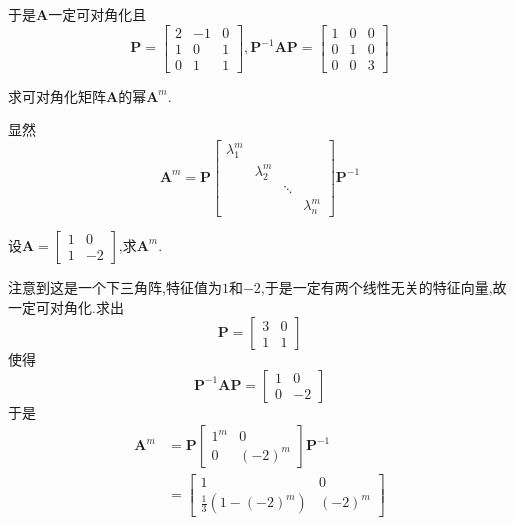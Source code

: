 \begin{brown}
\begin{Proof}
于是$\bm{A}$一定可对角化且
\[
\bm{P}=\begin{bmatrix}
    2&-1&0\\1&0&1\\0&1&1
\end{bmatrix}
,
\bm{P}^{-1}\bm{AP}=\begin{bmatrix}
    1&0&0\\0&1&0\\0&0&3
\end{bmatrix}
\]
\end{Proof}
\end{brown}
\begin{brown}
\begin{example}
    求可对角化矩阵$\bm{A}$的幂$\bm{A}^m$.
\end{example}
\begin{solution}
    显然
    \[
    \bm{A}^m=
    \bm{P}\begin{bmatrix}
        \lambda_1^m&&&\\
        &\lambda_2^m&&\\
        &&\ddots&\\
        &&&\lambda_n^m
    \end{bmatrix}\bm{P}^{-1}
    \]
\end{solution}
\end{brown}
\begin{brown}
\begin{example}
    设$\bm{A}=\begin{bmatrix}
        1&0\\1&-2
    \end{bmatrix}$,求$\bm{A}^{m}.$
\end{example}
\begin{solution}
    注意到这是一个下三角阵,特征值为$1$和$-2$,于是一定有两个线性无关的特征向量,故一定可对角化.求出\[
    \bm{P}=\begin{bmatrix}
        3&0 \\ 1&1
    \end{bmatrix}
    \]使得
    \[
    \bm{P}^{-1}\bm{AP}=\begin{bmatrix}
        1&0\\0&-2
    \end{bmatrix}
    \]于是
    \begin{align*}
    \bm{A}^m&=\bm{P}\begin{bmatrix}
        1^m&0\\0&(-2)^m
    \end{bmatrix}\bm{P}^{-1}\\
    &=\begin{bmatrix}
        1&0\\
        \frac{1}{3}\left(
            1   -(-2)^m
        \right)&(-2)^m
    \end{bmatrix}
\end{align*}
\end{solution}
\end{brown}
